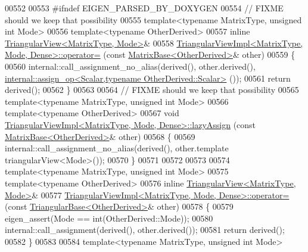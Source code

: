 \begin{DoxyCode}
00552 
00553 \textcolor{preprocessor}{#ifndef EIGEN\_PARSED\_BY\_DOXYGEN}
00554 \textcolor{comment}{// FIXME should we keep that possibility}
00555 \textcolor{keyword}{template}<\textcolor{keyword}{typename} MatrixType, \textcolor{keywordtype}{unsigned} \textcolor{keywordtype}{int} Mode>
00556 \textcolor{keyword}{template}<\textcolor{keyword}{typename} OtherDerived>
00557 \textcolor{keyword}{inline} \hyperlink{group___core___module_class_eigen_1_1_triangular_view}{TriangularView<MatrixType, Mode>}&
00558 \hyperlink{class_eigen_1_1_triangular_view_impl}{TriangularViewImpl<MatrixType, Mode, Dense>::operator=}
      (\textcolor{keyword}{const} \hyperlink{group___core___module_class_eigen_1_1_matrix_base}{MatrixBase<OtherDerived>}& other)
00559 \{
00560   internal::call\_assignment\_no\_alias(derived(), other.derived(), 
      \hyperlink{struct_eigen_1_1internal_1_1assign__op}{internal::assign\_op<Scalar,typename OtherDerived::Scalar>}
      ());
00561   \textcolor{keywordflow}{return} derived();
00562 \}
00563 
00564 \textcolor{comment}{// FIXME should we keep that possibility}
00565 \textcolor{keyword}{template}<\textcolor{keyword}{typename} MatrixType, \textcolor{keywordtype}{unsigned} \textcolor{keywordtype}{int} Mode>
00566 \textcolor{keyword}{template}<\textcolor{keyword}{typename} OtherDerived>
00567 \textcolor{keywordtype}{void} \hyperlink{class_eigen_1_1_triangular_view_impl}{TriangularViewImpl<MatrixType, Mode, Dense>::lazyAssign}
      (\textcolor{keyword}{const} \hyperlink{group___core___module_class_eigen_1_1_matrix_base}{MatrixBase<OtherDerived>}& other)
00568 \{
00569   internal::call\_assignment\_no\_alias(derived(), other.template triangularView<Mode>());
00570 \}
00571 
00572 
00573 
00574 \textcolor{keyword}{template}<\textcolor{keyword}{typename} MatrixType, \textcolor{keywordtype}{unsigned} \textcolor{keywordtype}{int} Mode>
00575 \textcolor{keyword}{template}<\textcolor{keyword}{typename} OtherDerived>
00576 \textcolor{keyword}{inline} \hyperlink{group___core___module_class_eigen_1_1_triangular_view}{TriangularView<MatrixType, Mode>}&
00577 \hyperlink{class_eigen_1_1_triangular_view_impl}{TriangularViewImpl<MatrixType, Mode, Dense>::operator=}
      (\textcolor{keyword}{const} \hyperlink{group___core___module_class_eigen_1_1_triangular_base}{TriangularBase<OtherDerived>}& other)
00578 \{
00579   eigen\_assert(Mode == \textcolor{keywordtype}{int}(OtherDerived::Mode));
00580   internal::call\_assignment(derived(), other.derived());
00581   \textcolor{keywordflow}{return} derived();
00582 \}
00583 
00584 \textcolor{keyword}{template}<\textcolor{keyword}{typename} MatrixType, \textcolor{keywordtype}{unsigned} \textcolor{keywordtype}{int} Mode>

\end{DoxyCode}
